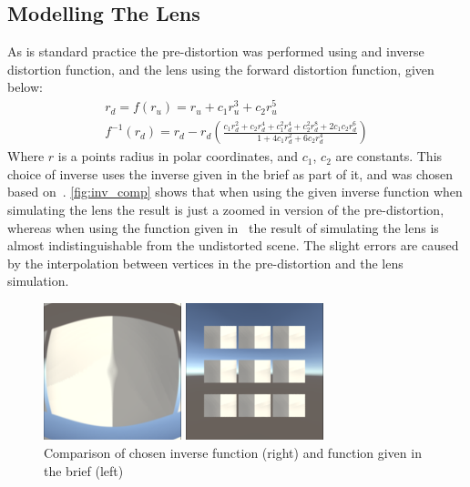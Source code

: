 \documentclass[]{article}
\begin{document}
\subsection{Modelling The Lens}
As is standard practice the pre-distortion was performed using and inverse distortion function, and the lens using the forward distortion function, given below:
\begin{gather*}
	r_d = f(r_u) = r_u + c_1r_u^3+c_2r_u^5 \\
	f^{-1}(r_d) = r_d - r_d\left(
	\frac{c_1r_d^2+c_2r_d^4+c_1^2r_d^4+c_2^2r_d^8+2c_1c_2r_d^6}{1+4c_1r_d^2+6c_2r_d^4}
	\right)
\end{gather*}
Where $r$ is a points radius in polar coordinates, and $c_1$, $c_2$ are constants. This choice of inverse uses the inverse given in the brief as part of it, and was chosen based on~\cite{inverse}. \autoref{fig:inv_comp} shows that when using the given inverse function when simulating the lens the result is just a zoomed in version of the pre-distortion, whereas when using the function given in~\cite{inverse} the result of simulating the lens is almost indistinguishable from the undistorted scene. The slight errors are caused by the interpolation between vertices in the pre-distortion and the lens simulation.
\begin{figure}[H]
	\centering
	\begin{minipage}[H]{0.2\textwidth}
		\includegraphics[width=4cm]{inv_fail}
	\end{minipage}
	\hspace{1cm}
	\begin{minipage}[H]{0.2\textwidth}
		\includegraphics[width=4cm]{inv_success}
	\end{minipage}
	\caption{Comparison of chosen inverse function (right) and function given in the brief (left)}
	\label{fig:inv_comp}
\end{figure}
\end{document}
